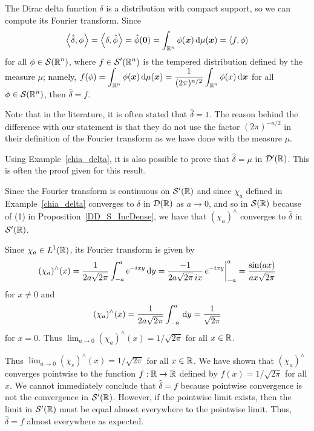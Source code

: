 \begin{egg}
The Dirac delta function $\delta$ is a distribution with compact
support, so we can compute its Fourier transform.  Since
\[
\left\langle{\hat{\delta}} , {\phi}\right\rangle = \left\langle{\delta} , {\hat{\phi}}\right\rangle = \hat{\phi}({\bm{0}})
= \int_{\mathbb{R}^n} \phi({\bm{x}}) \,\mathrm{d}{\mu({\bm{x}})} =
\left\langle{f} , {\phi}\right\rangle
\]
for all $\displaystyle \phi \in \mathcal{S}(\mathbb{R}^n)$, where
$\displaystyle f \in \mathcal{S}'(\mathbb{R}^n)$ is the
tempered distribution defined by the measure $\mu$; namely,
$\displaystyle f(\phi) = \int_{\mathbb{R}^n} \phi({\bm{x}}) \,\mathrm{d}{\mu({\bm{x}})}
= \frac{1}{(2\pi)^{n/2}} \int_{\mathbb{R}^n} \phi(x) \,\mathrm{d}{{\bm{x}}}$ for all
$\displaystyle \phi \in \mathcal{S}(\mathbb{R}^n)$, then $\hat{\delta} = f$.

Note that in the literature, it is often stated that $\hat{\delta} = 1$.
The reason behind the difference with our statement is that they do
not use the factor $\displaystyle (2\pi)^{-n/2}$ in their definition
of the Fourier transform as we have done with the measure $\mu$.
\end{egg}

\begin{egg}
Using Example~\ref{chia_delta}, it is also possible to prove that
$\hat{\delta} = \mu$ in $\mathcal{D}'(\mathbb{R})$.   This is often the proof given
for this result.

Since the Fourier transform is continuous on $\mathcal{S}'(\mathbb{R})$ and since
$\chi_a$ defined in Example~\ref{chia_delta} converges to $\delta$
in $\mathcal{D}(\mathbb{R})$ as $a \to 0$, and so in $\mathcal{S}(\mathbb{R})$ because of (1) in
Proposition~\ref{DD_S_IncDense}, we have that
$\displaystyle (\chi_a)^\wedge$ converges to $\hat{\delta}$ in $\mathcal{S}'(\mathbb{R})$.

Since $\displaystyle \chi_a \in L^1(\mathbb{R})$, its Fourier transform is
given by
\[
(\chi_a)^\wedge(x) = \frac{1}{2a \sqrt{2\pi}}\int_{-a}^a e^{-ix y}\,\mathrm{d}{y}
= \frac{-1}{2a \sqrt{2\pi}\, i x}\, e^{-i x y}\bigg|_{-a}^a
= \frac{\sin(a x)}{a x \sqrt{2\pi}}
\]
for $x \neq 0$ and
\[
(\chi_a)^\wedge(x) = \frac{1}{2a \sqrt{2\pi}}\int_{-a}^a \,\mathrm{d}{y}
= \frac{1}{\sqrt{2\pi}}
\]
for $x = 0$.   Thus
$\displaystyle \lim_{a\to 0} (\chi_a)^\wedge(x) = 1/\sqrt{2\pi}$
for all $x \in \mathbb{R}$.

Thus $\displaystyle \lim_{a\to 0} (\chi_s)^\wedge(x) = 1/\sqrt{2\pi}$
for all $x \in \mathbb{R}$.  We have shown that
$\displaystyle (\chi_a)^\wedge$ converges pointwise to the function
$f:\mathbb{R}\to \mathbb{R}$ defined by $f(x) = 1/\sqrt{2\pi}$ for
all $x$.  We cannot immediately conclude that $\hat{\delta} = f$
because pointwise convergence is not the convergence in $\mathcal{S}'(\mathbb{R})$.
However, if the pointwise limit exists, then the limit in $\mathcal{S}'(\mathbb{R})$
must be equal almost everywhere to the pointwise limit.  Thus,
$\hat{\delta} = f$ almost everywhere as expected.
\end{egg}


